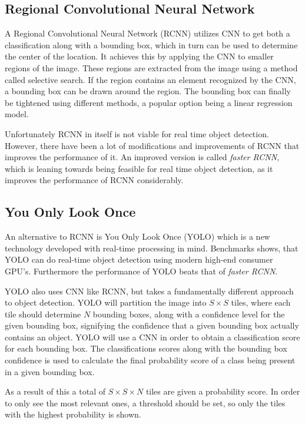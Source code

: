 \subsection{Regional Convolutional Neural Network}
A Regional Convolutional Neural Network (RCNN) utilizes CNN to get both a classification along with a bounding box, which in turn can be used to determine the center of the location.
It achieves this by applying the CNN to smaller regions of the image. 
These regions are extracted from the image using a method called selective search.
If the region contains an element recognized by the CNN, a bounding box can be drawn around the region.
The bounding box can finally be tightened using different methods, a popular option being a linear regression model\cite{CNNHistory}.

Unfortunately RCNN in itself is not viable for real time object detection.
However, there have been a lot of modifications and improvements of RCNN that improves the performance of it.
An improved version is called \textit{faster RCNN}, which is leaning towards being feasible for real time object detection, as it improves the performance of RCNN considerably\cite{fasterRCNN}.

\subsection{You Only Look Once}\label{sec:YOLOAnalysis}
An alternative to RCNN is You Only Look Once (YOLO) which is a new technology developed with real-time processing in mind.
Benchmarks shows, that YOLO can do real-time object detection using modern high-end consumer GPU's.
Furthermore the performance of YOLO beats that of \textit{faster RCNN}\cite{odDetection}.

YOLO also uses CNN like RCNN, but takes a fundamentally different approach to object detection.
YOLO will partition the image into $S\times S$ tiles, where each tile should determine $N$ bounding boxes, along with a confidence level for the given bounding box, signifying the confidence that a given bounding box actually contains an object.
YOLO will use a CNN in order to obtain a classification score for each bounding box.
The classifications scores along with the bounding box confidence is used to calculate the final probability score of a class being present in a given bounding box\cite{odDetection}.

As a result of this a total of $S\times S\times N$ tiles are given a probability score.
In order to only see the most relevant ones, a threshold should be set, so only the tiles with the highest probability is shown.

